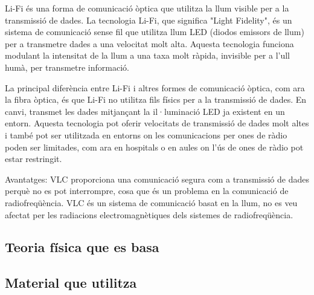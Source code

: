 
Li-Fi és una forma de comunicació òptica que utilitza la llum visible per a la transmissió de dades. La tecnologia Li-Fi, que significa "Light Fidelity", és un sistema de comunicació sense fil que utilitza llum LED (diodos emissors de llum) per a transmetre dades a una velocitat molt alta. Aquesta tecnologia funciona modulant la intensitat de la llum a una taxa molt ràpida, invisible per a l'ull humà, per transmetre informació.


La principal diferència entre Li-Fi i altres formes de comunicació òptica, com ara la fibra òptica, és que Li-Fi no utilitza fils físics per a la transmissió de dades. En canvi, transmet les dades mitjançant la il·luminació LED ja existent en un entorn. Aquesta tecnologia pot oferir velocitats de transmissió de dades molt altes i també pot ser utilitzada en entorns on les comunicacions per ones de ràdio poden ser limitades, com ara en hospitals o en aules on l'ús de ones de ràdio pot estar restringit.




Avantatges: VLC proporciona una comunicació segura com a transmissió de dades perquè no es pot interrompre, cosa que és un problema en la comunicació de radiofreqüència. VLC és un sistema de comunicació basat en la llum, no es veu afectat per les radiacions electromagnètiques dels sistemes de radiofreqüència.


\subsection*{Teoria física que es basa}

\subsection*{Material que utilitza}